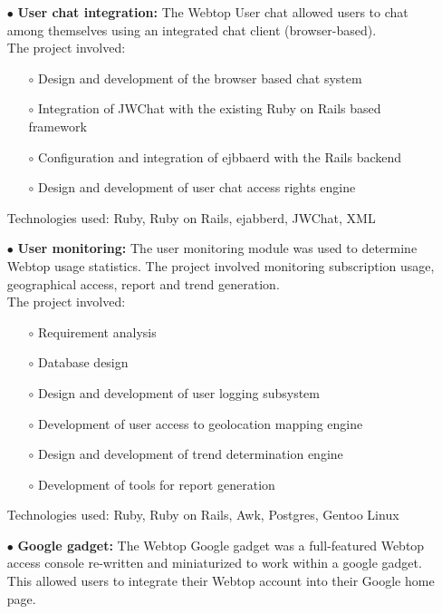 \documentclass{scrartcl}
\begin{document}
\begin{cv}{
\href{http://www.develmj.com}{}
}
{\begin{itemize}
  \item[\footnotesize$\bullet$] \textbf{User chat integration: }The Webtop User chat allowed users to chat among
    themselves using an integrated chat client (browser-based).\\
    The project involved:
    {\scriptsize
    \begin{itemize}
    \item[\footnotesize$\circ$] Design and development of the browser based chat system
    \item[\footnotesize$\circ$] Integration of JWChat with the existing Ruby on Rails based framework
    \item[\footnotesize$\circ$] Configuration and integration of ejbbaerd with the Rails backend
    \item[\footnotesize$\circ$] Design and development of user chat
      access rights engine
    \end{itemize}}
    Technologies used: Ruby, Ruby on Rails, ejabberd, JWChat, XML
  \item[\footnotesize$\bullet$] \textbf{User monitoring: }The user monitoring module was used to determine
    Webtop usage statistics. The project involved monitoring subscription usage,
    geographical access, report and trend generation.\\
    The project involved:
    {\scriptsize
    \begin{itemize}
    \item[\footnotesize$\circ$] Requirement analysis
    \item[\footnotesize$\circ$] Database design
    \item[\footnotesize$\circ$] Design and development of user logging subsystem
    \item[\footnotesize$\circ$] Development of user access to geolocation mapping engine
    \item[\footnotesize$\circ$] Design and development of trend determination engine
    \item[\footnotesize$\circ$] Development of tools for report
      generation
    \end{itemize}}
    Technologies used: Ruby, Ruby on Rails, Awk, Postgres, Gentoo Linux
  \item[\footnotesize$\bullet$] \textbf{Google gadget: }The Webtop Google gadget was a full-featured Webtop
    access console re-written and miniaturized to work within a google gadget.
    This allowed users to integrate their Webtop account into their Google home
    page.\\

\end{itemize}}
\end{cv}
\end{document}
